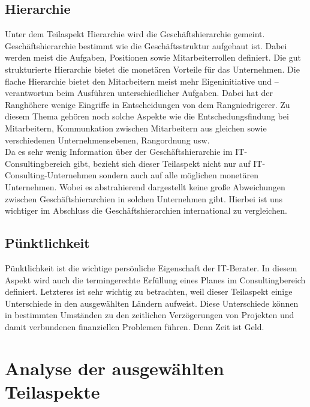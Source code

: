 \subsection*{Hierarchie}
Unter dem Teilaspekt Hierarchie wird die Geschäftshierarchie gemeint. Geschäftshierarchie bestimmt wie die Geschäftsstruktur aufgebaut ist. Dabei werden meist die Aufgaben, Positionen sowie Mitarbeiterrollen definiert. Die gut strukturierte Hierarchie bietet die monetären Vorteile für das Unternehmen. Die flache Hierarchie bietet den Mitarbeitern meist mehr Eigeninitiative und –verantwortun beim Ausführen unterschiedlicher Aufgaben.  Dabei hat der Ranghöhere wenige Eingriffe in  Entscheidungen von dem Rangniedrigerer.
Zu diesem Thema gehören noch solche Aspekte wie die Entschedungsfindung bei Mitarbeitern, Kommunkation zwischen Mitarbeitern aus gleichen sowie verschiedenen Unternehmensebenen,  Rangordnung usw.\\
Da es sehr wenig Information über der Geschäftshierarchie im IT-Consultingbereich gibt, bezieht sich dieser Teilaspekt nicht nur auf IT-Consulting-Unternehmen sondern auch auf alle möglichen monetären Unternehmen. Wobei es  abstrahierend dargestellt  keine große Abweichungen zwischen Geschäftshierarchien in solchen Unternehmen gibt. Hierbei ist uns wichtiger im Abschluss die Geschäftshierarchien international zu vergleichen.
\subsection*{Pünktlichkeit}
Pünktlichkeit ist die wichtige persönliche Eigenschaft der IT-Berater. In diesem Aspekt wird auch die termingerechte Erfüllung eines Planes im Consultingbereich definiert.  Letzteres  ist sehr wichtig zu betrachten, weil dieser Teilaspekt einige Unterschiede in den ausgewählten Ländern aufweist. Diese Unterschiede können in bestimmten Umständen zu den zeitlichen Verzögerungen von Projekten und damit verbundenen finanziellen Problemen führen. Denn  Zeit ist Geld.
\section{Analyse der ausgewählten Teilaspekte}
